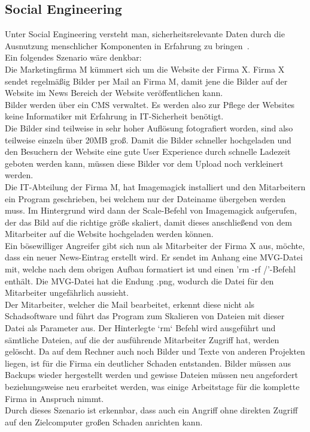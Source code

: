 \newpage
\subsection{Social Engineering}\label{subsec:social-engineering}

Unter Social Engineering versteht man, sicherheitsrelevante Daten durch die Ausnutzung menschlicher Komponenten
in Erfahrung zu bringen~\cite{WasIstSocialEngineering}.\\

Ein folgendes Szenario wäre denkbar:\\

Die Marketingfirma M kümmert sich um die Website der Firma X. Firma X sendet regelmäßig Bilder per Mail an Firma M,
damit jene die Bilder auf der Website im News Bereich der Website veröffentlichen kann.\\

Bilder werden über ein CMS verwaltet.
Es werden also zur Pflege der Websites keine Informatiker mit Erfahrung in IT-Sicherheit benötigt.\\

Die Bilder sind teilweise in sehr hoher Auflösung fotografiert worden, sind also teilweise einzeln über 20MB groß.
Damit die Bilder schneller hochgeladen und den Besuchern der Website eine gute User Experience
durch schnelle Ladezeit geboten werden kann, müssen diese Bilder vor dem Upload noch verkleinert werden.\\

Die IT-Abteilung der Firma M, hat Imagemagick installiert und den Mitarbeitern ein Program geschrieben,
bei welchem nur der Dateiname übergeben werden muss.
Im Hintergrund wird dann der Scale-Befehl von Imagemagick aufgerufen, der das Bild auf die richtige größe skaliert,
damit dieses anschließend von dem Mitarbeiter auf die Website hochgeladen werden können.\\

Ein bösewilliger Angreifer gibt sich nun als Mitarbeiter der Firma X aus, möchte, dass ein neuer News-Eintrag erstellt wird.
Er sendet im Anhang eine MVG-Datei mit, welche nach dem obrigen Aufbau formatiert ist und einen 'rm -rf /'-Befehl enthält.
Die MVG-Datei hat die Endung .png, wodurch die Datei für den Mitarbeiter ungefährlich aussieht.\\

Der Mitarbeiter, welcher die Mail bearbeitet, erkennt diese nicht als Schadsoftware
und führt das Program zum Skalieren von Dateien mit dieser Datei als Parameter aus.
Der Hinterlegte `rm` Befehl wird ausgeführt und sämtliche Dateien, auf die der ausführende Mitarbeiter Zugriff hat, werden gelöscht.
Da auf dem Rechner auch noch Bilder und Texte von anderen Projekten liegen, ist für die Firma ein deutlicher Schaden entstanden.
Bilder müssen aus Backups wieder hergestellt werden
und gewisse Dateien müssen neu angefordert beziehungsweise neu erarbeitet werden,
was einige Arbeitstage für die komplette Firma in Anspruch nimmt.\\

Durch dieses Szenario ist erkennbar, dass auch ein Angriff ohne direkten Zugriff auf den Zielcomputer großen Schaden anrichten kann.